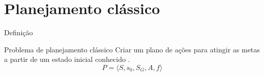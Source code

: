 \begin{frame}
  \titlepage
\end{frame}


%     
% 


\section{Planejamento clássico}
\begin{frame}{Definição}
    \begin{block}{Problema de planejamento clássico}
        Criar um plano de ações para atingir as metas a partir de um estado 
        inicial conhecido \cite{Ghallab:2004}. \\
        \[
            P = \langle S, s_0, S_G, A, f \rangle
        \]
    \end{block}
    
\end{frame}

